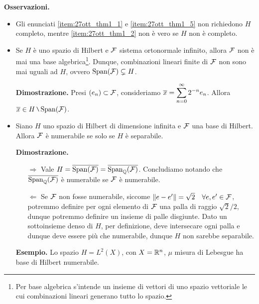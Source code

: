 \textbf{Osservazioni.}
\begin{itemize}
\item Gli enunciati \ref{item:27ott_thm1_1} e \ref{item:27ott_thm1_5} non richiedono $H$ completo, mentre \ref{item:27ott_thm1_2} non è vero se $H$ non è completo.

\item Se $H$ è uno spazio di Hilbert e $\mathcal{F}$ sistema ortonormale infinito, allora $\mathcal{F}$ non è mai una base algebrica\footnote{Per base algebrica s'intende un insieme di vettori di uno spazio vettoriale le cui combinazioni lineari generano tutto lo spazio.}. Dunque, combinazioni lineari finite di $\mathcal{F}$ non sono mai uguali ad $H$, ovvero $\operatorname{Span}(\mathcal{F}) \subsetneq H $.

\textbf{Dimostrazione.} Presi $(e_n) \subset \mathcal{F}$, consideriamo $\displaystyle \overline{x} = \sum_{n=0}^{\infty} 2^{-n}e_n $. Allora  $\ds \ol{x} \in H \setminus \spn(\mc{F})$.
%

\item Siano $H$ uno spazio di Hilbert di dimensione infinita e $\mathcal{F}$ una base di Hilbert. Allora $\mathcal{F}$ è numerabile se solo se $H$ è separabile.

\textbf{Dimostrazione.}

\begin{itemize}

\item[$\boxed{\Rightarrow}$] Vale $ H = \overline{\operatorname{Span}(\mathcal{F})} = \overline{\operatorname{Span}_\mathbb Q (\mathcal{F})} $. Concludiamo notando che $\overline{\operatorname{Span}_\mathbb Q (\mathcal{F})}$ è numerabile se  $\mathcal{F}$ è numerabile.

\item[$\boxed{\Leftarrow}$] Se $\mathcal{F}$ non fosse numerabile, siccome $\left\lVert e - e' \right\rVert = \sqrt{2}  \quad \forall e,e' \in \mathcal{F}$, potremmo definire per ogni elemento di $\mathcal{F}$ una palla di raggio $\sqrt{2}/2$, dunque potremmo definire un insieme di palle disgiunte. Dato un sottoinsieme denso di $H$, per definizione, deve intersecare ogni palla e dunque deve essere più che numerabile, dunque $H$ non sarebbe separabile.

\end{itemize}


\textbf{Esempio.} Lo spazio $H = L^2(X)$, con $X = \mathbb R^n$, $\mu $ misura di Lebesgue ha base di Hilbert numerabile.


\end{itemize}
